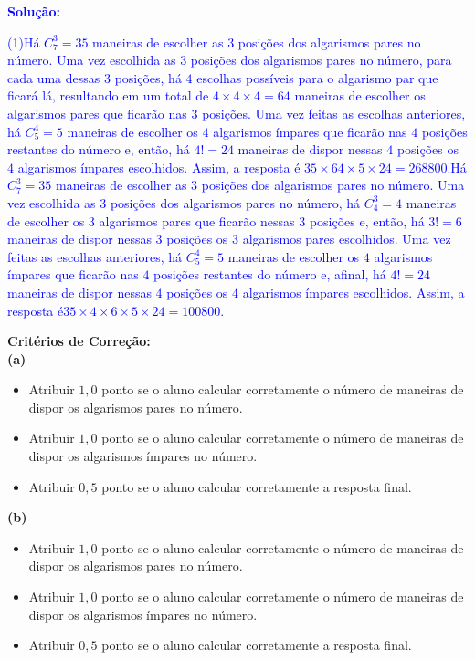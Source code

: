\documentclass[oneside,a4paper,12pt]{article}
\newcommand{\negrito}[1]{\mbox{\boldmath{$#1$}}}
\theoremstyle{Colorido}
\theoremstyle{solu}
\theoremstyle{dotlessP}
\newcommand{\solucao}[1]{\textcolor{blue}{\textbf{Solução:} #1}}
\begin{document}
\solucao{\begin{tasks}[counter-format={(tsk[a])},label-width=3.6ex, label-format = {\bfseries}, column-sep = {20pt}](1)\task[\textcolor{blue}{$\negrito{(a)} $}] Há $C_7^3=35$ maneiras de escolher as $3$ posições dos algarismos pares no número. Uma vez escolhida as $3$ posições dos algarismos pares no número, para cada uma dessas $3$ posições, há $4$ escolhas possíveis para o algarismo par que ficará lá, resultando em um total de $4\times4\times4=64$ maneiras de escolher os algarismos pares que ficarão nas $3$ posições. Uma vez feitas as escolhas anteriores, há $C_5^4=5$ maneiras de escolher os $4$ algarismos ímpares que ficarão nas $4$ posições restantes do número e, então, há $4!=24$ maneiras de dispor nessas $4$ posições os $4$ algarismos ímpares escolhidos. Assim, a resposta é $35\times64\times5\times24=268800$.\task[\textcolor{blue}{$\negrito{(b)} $}] Há $C_7^3=35$ maneiras de escolher as $3$ posições dos algarismos pares no número. Uma vez escolhida as $3$ posições dos algarismos pares no número, há $C_4^3=4$ maneiras de escolher os $3$ algarismos pares que ficarão nessas $3$ posições e, então, há $3!=6$ maneiras de dispor nessas $3$ posições os $3$ algarismos pares escolhidos. Uma vez feitas as escolhas anteriores, há $C_5^4=5$ maneiras de escolher os $4$ algarismos ímpares que ficarão nas $4$ posições restantes do número e, afinal, há $4!=24$ maneiras de dispor nessas $4$ posições os $4$ algarismos ímpares escolhidos. Assim, a resposta é$35\times4\times6\times5\times24=100800$.\end{tasks}}
\begin{mdframed}
\textbf{Critérios de Correção:} \\
\textbf{(a)} 
\begin{itemize}
    \item Atribuir $1,0$ ponto se o aluno calcular corretamente o número de maneiras de dispor os algarismos pares no número.
    \item Atribuir $1,0$ ponto se o aluno calcular corretamente o número de maneiras de dispor os algarismos ímpares no número.
    \item Atribuir $0,5$ ponto se o aluno calcular corretamente a resposta final.
\end{itemize}
\textbf{(b)} 
\begin{itemize}
    \item Atribuir $1,0$ ponto se o aluno calcular corretamente o número de maneiras de dispor os algarismos pares no número.
    \item Atribuir $1,0$ ponto se o aluno calcular corretamente o número de maneiras de dispor os algarismos ímpares no número.
    \item Atribuir $0,5$ ponto se o aluno calcular corretamente a resposta final.
\end{itemize}
\end{mdframed}
\end{document}
